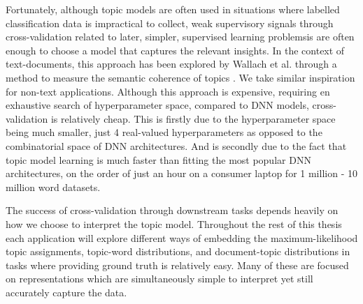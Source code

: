 Fortunately, although topic models are often used in situations where labelled classification data is impractical to collect, weak supervisory signals through cross-validation related to later, simpler, supervised learning problemsis are often enough to choose a model that captures the relevant insights. In the context of text-documents, this approach has been explored by Wallach et al. through a method to measure the semantic coherence of topics \citep{Wallach2009}. We take similar inspiration for non-text applications. Although this approach is expensive, requiring en exhaustive search of hyperparameter space, compared to DNN models, cross-validation is relatively cheap. This is firstly due to the hyperparameter space being much smaller, just 4 real-valued hyperparameters as opposed to the combinatorial space of DNN architectures. And is secondly due to the fact that topic model learning is much faster than fitting the most popular DNN architectures, on the order of just an hour on a consumer laptop for 1 million - 10 million word datasets.

The success of cross-validation through downstream tasks depends heavily on how we choose to interpret the topic model. Throughout the rest of this thesis each application will explore different ways of embedding the maximum-likelihood topic assignments, topic-word distributions, and document-topic distributions in tasks where providing ground truth is relatively easy. Many of these are focused on representations which are simultaneously simple to interpret yet still accurately capture the data. 